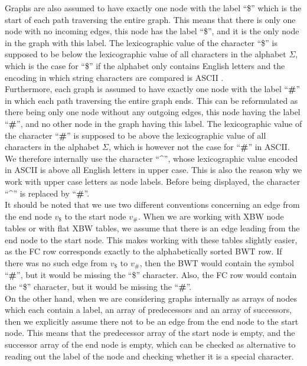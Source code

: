 \documentclass[a4paper,12pt,twoside,BCOR=10mm]{scrbook}
\begin{document}
Graphs are also assumed to have exactly one node with the label “\$” which 
is the start of each path traversing the entire graph. This means that there is only one node with no incoming 
edges, this node has the label “\$”, and it is the only node in the graph with this label. 
The lexicographic value of the character “\$” is supposed to be below the 
lexicographic value of all characters in the alphabet $ \Sigma $, 
which is the case for “\$” if the alphabet only contains English letters and the encoding in 
which string characters are compared is ASCII \citep{ASCII}. \\
Furthermore, each graph is assumed to have exactly one node with the label “\textbf{\#}” in which 
each path traversing the entire graph ends. This can be reformulated as there being only one node without any 
outgoing edges, this node having the label “\textbf{\#}”, and no other node in the graph having this label. 
The lexicographic value of the character “\textbf{\#}” is supposed to be above the 
lexicographic value of all characters in the alphabet $ \Sigma $, 
which is however not the case for “\textbf{\#}” in ASCII. 
We therefore internally use the character “{\textasciicircum}”, whose lexicographic value encoded in ASCII 
is above all English letters in upper case. 
This is also the reason why we work with upper case letters as node labels. 
Before being displayed, the character “{\textasciicircum}” is replaced by “\textbf{\#}”. \\
It should be noted that we use two different conventions concerning 
an edge from the end node $ v_{\$} $ to the start node $ v_{\textbf{\#}} $. 
When we are working with XBW node tables or with flat XBW tables, 
we assume that there is an edge leading from the end node to the start node. 
This makes working with these tables slightly easier, as the FC row corresponds 
exactly to the alphabetically sorted BWT row. 
If there was no such edge from $ v_{\$} $ to $ v_{\textbf{\#}} $, 
then the BWT would contain the symbol “\textbf{\#}”, but it would be missing the “\$” character. 
Also, the FC row would contain the “\$” character, but it would be missing the “\textbf{\#}”. \\
On the other hand, when we are considering graphs internally as arrays of nodes which 
each contain a label, an array of predecessors and an array of successors, 
then we explicitly assume there not to be an edge from the end node to the start node. 
This means that the predecessor array of the start node is empty, 
and the successor array of the end node is empty, 
which can be checked as alternative to reading out the label of the node and checking 
whether it is a special character.
\end{document}
